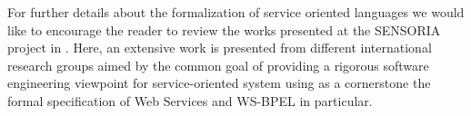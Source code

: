 For further details about the formalization of service oriented languages we would like to encourage the reader to review the works presented at the SENSORIA project in \cite{Wirsing2011bis}. Here, an extensive work is presented from different international research groups aimed by the common goal of providing a rigorous software engineering viewpoint for service-oriented system using as a cornerstone the formal specification of Web Services and WS-BPEL in particular.%


